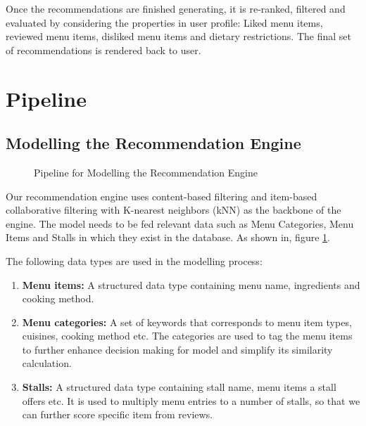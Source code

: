 Once the recommendations are finished generating, it is re-ranked, filtered and evaluated by considering the properties in user profile: Liked menu items, reviewed menu items, disliked menu items and dietary restrictions. The final set of recommendations is rendered back to user.


\newpage

\section{Pipeline}
\label{section:pipeline}

\subsection{Modelling the Recommendation Engine}
\begin{figure}[h!]
    \centering
    
    \caption{Pipeline for Modelling the Recommendation Engine}
    \label{fig:pipeline-for-modelling}
\end{figure}

Our recommendation engine uses content-based filtering and item-based collaborative filtering
with K-nearest neighbors (kNN) as the backbone of the engine. \cite{singhanddwivedi:2023}
The model needs to be fed relevant data such as Menu Categories, Menu Items and Stalls in which they exist in
the database. As shown in, figure \ref{fig:pipeline-for-modelling}.

The following data types are used in the modelling process:

\begin{enumerate}[leftmargin=80pt]
    \item \textbf{Menu items:} A structured data type containing menu name, ingredients and cooking method.
    \item \textbf{Menu categories:} A set of keywords that corresponds to menu item types, cuisines, cooking method etc.
    The categories are used to tag the menu items to further enhance decision making for model and simplify its
    similarity calculation.
    \item \textbf{Stalls:} A structured data type containing stall name, menu items a stall offers etc.
    It is used to multiply menu entries to a number of stalls, so that we can further score specific item from reviews.
\end{enumerate}

